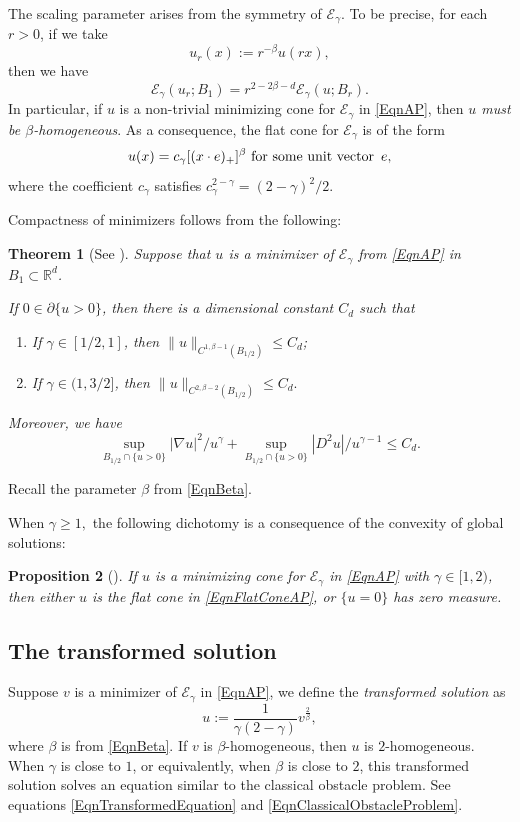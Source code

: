\documentclass{amsart}
\def\R {\mathbb{R}}
\def\PosS{\{u>0\}}
\def\PPosS{\partial\{u>0\}}
\def\Diri{|\nabla u|^2}
\def\EGa{\mathcal{E}_\gamma}
\def\hem{\hspace{0.5em}}
\newtheorem{thm}{Theorem}[section]
\newtheorem{prop}[thm]{Proposition}
\theoremstyle{definition}
\numberwithin{equation}{section}
\theoremstyle{remark}
\begin{document}
The scaling parameter arises from  the symmetry of $\EGa$. To be precise, for each $r>0$, if we take
$$
u_r(x):=r^{-\beta}u(rx),
$$
then we have 
$$
\EGa(u_r;B_1)=r^{2-2\beta-d}\EGa(u;B_r).
$$
In particular, if $u$ is a non-trivial minimizing cone for $\EGa$ in \eqref{EqnAP}, then \textit{$u$ must be $\beta$-homogeneous}. As a consequence, the flat cone for $\EGa$ is of the form
\begin{equation}
\label{EqnFlatConeAP}
u(x)=c_\gamma[(x\cdot e)_+]^\beta \text{ for some unit vector}\hem e,
\end{equation} 
where the coefficient $c_\gamma$ satisfies
$
c_\gamma^{2-\gamma}=(2-\gamma)^2/2.
$

Compactness of  minimizers follows from the following:
\begin{thm}[See \cite{AP}]
\label{ThmRegularityOfMinimizerAP}
Suppose that $u$ is a minimizer of $\EGa$ from \eqref{EqnAP} in $B_1\subset\R^d$. 

If $0\in\PPosS$, then there is a dimensional constant $C_d$ such that 
\begin{enumerate}
\item{If $\gamma\in[1/2,1]$, then $\|u\|_{C^{1,\beta-1}(B_{1/2})}\le C_d$;}
\item{If $\gamma\in(1,3/2]$, then $\|u\|_{C^{2,\beta-2}(B_{1/2})}\le C_d.$}
\end{enumerate}
Moreover, we have
$$
\sup_{B_{1/2}\cap\PosS}\Diri/u^\gamma+\sup_{B_{1/2}\cap\PosS}|D^2u|/u^{\gamma-1}\le C_d.
$$
\end{thm} 
Recall the parameter $\beta$ from \eqref{EqnBeta}.

When $\gamma\ge1,$ the following dichotomy is a consequence of  the convexity of global solutions:
\begin{prop}[\cite{B, C, PSU, WY}]
\label{PropConvexityOfSolutions}
If $u$ is a minimizing cone for  $\EGa$ in \eqref{EqnAP} with $\gamma\in[1,2)$, then either $u$ is the flat cone in \eqref{EqnFlatConeAP}, or $\{u=0\}$ has zero measure.
\end{prop} 






\subsection{The transformed solution}
\label{SubsectionTransformedSolution}
Suppose $v$ is a minimizer of $\EGa$ in \eqref{EqnAP}, we define the \textit{transformed solution} as
\begin{equation}
\label{EqnTransformedSolution}
u:=\frac{1}{\gamma(2-\gamma)}v^{\frac{2}{\beta}},
\end{equation} 
where $\beta$ is from \eqref{EqnBeta}.  If $v$ is $\beta$-homogeneous, then $u$ is $2$-homogeneous. When $\gamma$ is close to $1$, or equivalently, when $\beta$ is close to $2$, this transformed solution solves an equation similar to the classical obstacle problem. See equations \eqref{EqnTransformedEquation}  and \eqref{EqnClassicalObstacleProblem}.
\end{document}
